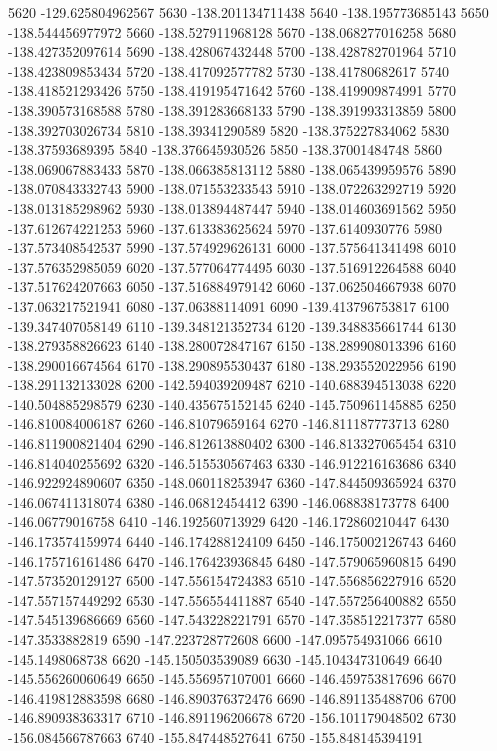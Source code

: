 {5620 -129.625804962567
5630 -138.201134711438
5640 -138.195773685143
5650 -138.544456977972
5660 -138.527911968128
5670 -138.068277016258
5680 -138.427352097614
5690 -138.428067432448
5700 -138.428782701964
5710 -138.423809853434
5720 -138.417092577782
5730 -138.41780682617
5740 -138.418521293426
5750 -138.419195471642
5760 -138.419909874991
5770 -138.390573168588
5780 -138.391283668133
5790 -138.391993313859
5800 -138.392703026734
5810 -138.39341290589
5820 -138.375227834062
5830 -138.37593689395
5840 -138.376645930526
5850 -138.37001484748
5860 -138.069067883433
5870 -138.066385813112
5880 -138.065439959576
5890 -138.070843332743
5900 -138.071553233543
5910 -138.072263292719
5920 -138.013185298962
5930 -138.013894487447
5940 -138.014603691562
5950 -137.612674221253
5960 -137.613383625624
5970 -137.6140930776
5980 -137.573408542537
5990 -137.574929626131
6000 -137.575641341498
6010 -137.576352985059
6020 -137.577064774495
6030 -137.516912264588
6040 -137.517624207663
6050 -137.516884979142
6060 -137.062504667938
6070 -137.063217521941
6080 -137.06388114091
6090 -139.413796753817
6100 -139.347407058149
6110 -139.348121352734
6120 -139.348835661744
6130 -138.279358826623
6140 -138.280072847167
6150 -138.289908013396
6160 -138.290016674564
6170 -138.290895530437
6180 -138.293552022956
6190 -138.291132133028
6200 -142.594039209487
6210 -140.688394513038
6220 -140.504885298579
6230 -140.435675152145
6240 -145.750961145885
6250 -146.810084006187
6260 -146.81079659164
6270 -146.811187773713
6280 -146.811900821404
6290 -146.812613880402
6300 -146.813327065454
6310 -146.814040255692
6320 -146.515530567463
6330 -146.912216163686
6340 -146.922924890607
6350 -148.060118253947
6360 -147.844509365924
6370 -146.067411318074
6380 -146.06812454412
6390 -146.068838173778
6400 -146.06779016758
6410 -146.192560713929
6420 -146.172860210447
6430 -146.173574159974
6440 -146.174288124109
6450 -146.175002126743
6460 -146.175716161486
6470 -146.176423936845
6480 -147.579065960815
6490 -147.573520129127
6500 -147.556154724383
6510 -147.556856227916
6520 -147.557157449292
6530 -147.556554411887
6540 -147.557256400882
6550 -147.545139686669
6560 -147.543228221791
6570 -147.358512217377
6580 -147.3533882819
6590 -147.223728772608
6600 -147.095754931066
6610 -145.1498068738
6620 -145.150503539089
6630 -145.104347310649
6640 -145.556260060649
6650 -145.556957107001
6660 -146.459753817696
6670 -146.419812883598
6680 -146.890376372476
6690 -146.891135488706
6700 -146.890938363317
6710 -146.891196206678
6720 -156.101179048502
6730 -156.084566787663
6740 -155.847448527641
6750 -155.848145394191
}
